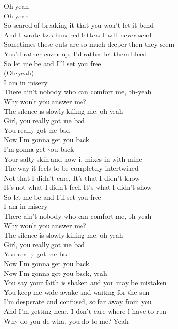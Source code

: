 Oh-yeah \\
Oh-yeah \\
So scared of breaking it that you won't let it bend \\
And I wrote two hundred letters I will never send \\
Sometimes these cuts are so much deeper then they seem \\
You'd rather cover up, I'd rather let them bleed \\
So let me be and I'll set you free \\
(Oh-yeah) \\
I am in misery \\
There ain't nobody who can comfort me, oh-yeah \\
Why won't you answer me? \\
The silence is slowly killing me, oh-yeah \\
Girl, you really got me bad \\
You really got me bad \\
Now I'm gonna get you back \\
I'm gonna get you back \\
Your salty skin and how it mixes in with mine \\
The way it feels to be completely intertwined \\
Not that I didn't care, It's that I didn't know \\
It's not what I didn't feel, It's what I didn't show \\
So let me be and I'll set you free \\
I am in misery \\
There ain't nobody who can comfort me, oh-yeah \\
Why won't you answer me? \\
The silence is slowly killing me, oh-yeah \\
Girl, you really got me bad \\
You really got me bad \\
Now I'm gonna get you back \\
Now I'm gonna get you back, yeah \\
You say your faith is shaken and you may be mistaken \\
You keep me wide awake and waiting for the sun \\
I'm desperate and confused, so far away from you \\
And I'm getting near, I don't care where I have to run \\
Why do you do what you do to me? Yeah \\

